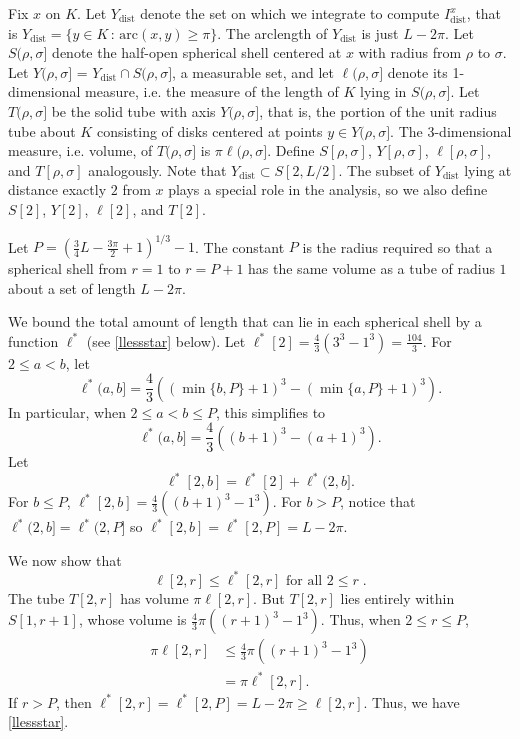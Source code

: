 \documentclass{elsart}
\begin{document}
\begin{pf}
Fix $x$ on $K$.   
Let
$Y_{\mathrm{dist}}$ denote the set on which we integrate
to compute
$I_{\mathrm{dist}}^x$,
that is $Y_{\mathrm{dist}}=\{y
\in K \,:\,\mathrm{arc}(x,y) \geq \pi\} $.  The arclength of
$Y_{\mathrm{dist}}$ is just $L-2 \pi$. Let
$S(\rho,\sigma]$ denote the half-open spherical shell
centered at
$x$ with radius from $\rho$ to $\sigma$. 
  Let 
$Y(\rho, \sigma]$ = $Y_{\mathrm{dist}}
\cap S(\rho, \sigma]$,  a measurable set, and let
$\ell (\rho,\sigma]$ denote its 1-dimensional measure,
i.e.{} the  measure of the length of $K$ lying in 
$S(\rho,\sigma]$.  Let 
$T(\rho,\sigma]$ be the solid tube with axis
$Y(\rho,\sigma]$, that is, the portion of the unit radius
tube about $K$ consisting of disks centered at points
$y\in Y(\rho,\sigma]$.  The 3-dimensional measure, i.e.{}
volume, of $T(\rho,\sigma]$ is
$\pi \ell(\rho,\sigma]$.
Define $S[\rho,\sigma]$, $Y[\rho,\sigma]$, $\ell[\rho,\sigma]$, and
$T[\rho,\sigma]$ analogously.
Note that $Y_{\mathrm{dist}} \subset S[2,L/2]  $. 
The subset of $Y_{\mathrm{dist}}$ 
lying at distance exactly $2$ from $x$ plays 
a special role in the analysis, so we also define  
$S[2]$, $Y[2]$, $\ell[2]$, and $T[2]$.

Let $P=(\frac{3}{4}L-\frac{3\pi}{2}+1)^{1/3}-1$.  
The constant $P$ is the
radius required so that a spherical shell from 
$r=1$ to $r=P+1$ has the same volume
as a tube of radius $1$ about a set of length $L-2\pi$.

We bound the total amount of length that can lie in each spherical
shell by a function $\ell^*$ (see \eqref{llessstar} below).
Let $\ell^*[2]=\frac{4}{3}(3^3-1^3)=\frac{104}{3}$.  
For $2\leq a<b$, let
$$\ell^*(a,b]=\frac{4}{3}\left( (\min\{b,P\}+1)^3 - (\min\{a,P\}+1)^3 
\right).$$  
In particular, when
$2\leq a<b\leq P$, this simplifies to 
$$\ell^*(a,b]=\frac{4}{3}\left( (b+1)^3 - (a+1)^3 \right).$$  
Let 
$$\ell^*[2,b] = \ell^*[2] + \ell^*(2,b].$$
For $b\leq P$, $\ell^*[2,b]=\frac{4}{3}\left((b+1)^3-1^3\right)$.
For $b>P$, notice that $\ell^*(2,b]=
\ell^*(2,P]$ so $\ell^*[2,b]=\ell^*[2,P]=L-2\pi$.

We now show that 
\begin{equation}
\label{llessstar}
\ell[2,r]\leq \ell^*[2,r] \text{ for all }2\leq r\;.
\end{equation}
The tube $T[2,r]$ has volume
$\pi\ell[2,r]$.  
But $T[2,r]$ lies entirely within $S[1,r+1]$,
whose volume is $\frac{4}{3}\pi\left( (r+1)^3-1^3\right)$.
Thus, when $2\leq r\leq P$,
\begin{align*}
\pi\ell[2,r]&\leq \frac{4}{3}\pi\left((r+1)^3-1^3\right)\\
&= \pi\ell^*[2,r].
\end{align*} 
If $r>P$, then $\ell^*[2,r]=\ell^*[2,P]=
L-2\pi\geq \ell[2,r]$. Thus, we have \eqref{llessstar}.


\end{pf}
\end{document}
